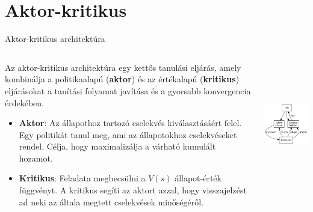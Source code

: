 \documentclass[english, aspectratio=169]{beamer}
\makeatletter
\let\origtableofcontents=\tableofcontents
\def\tableofcontents{\@ifnextchar[{\origtableofcontents}{\gobbletableofcontents}}
\def\gobbletableofcontents#1{\origtableofcontents}
\makeatother
\begin{document}
\section{Aktor-kritikus}

\begin{frame}
\tableofcontents[currentsection]
\end{frame}

\begin{frame}{Aktor-kritikus architektúra}
\begin{columns}
\begin{column}{.6\textwidth}
Az aktor-kritikus architektúra egy kettős tanulási eljárás, amely kombinálja a politikaalapú (\textbf{aktor}) és az értékalapú (\textbf{kritikus}) eljárásokat a tanítási folyamat javítása és a gyorsabb konvergencia érdekében.\par\smallskip
\begin{itemize}
	\item \textbf{Aktor}: Az állapothoz tartozó cselekvés kiválasztásáért felel. Egy politikát tanul meg, ami az állapotokhoz cselekvéseket rendel. Célja, hogy maximalizálja a várható kumulált hozamot. 
	\item \textbf{Kritikus}: Feladata megbecsülni a $V(s)$ állapot-érték függvényt. A kritikus segíti az aktort azzal, hogy visszajelzést ad neki az általa megtett cselekvések minőségéről. 
\end{itemize}
\end{column}
\begin{column}{.4\textwidth}
\begin{center}
\includegraphics[height=5.5cm, keepaspectratio]{graphs/dql_7.png}
\end{center}
\end{column}
\end{columns}
\end{frame}
\end{document}
